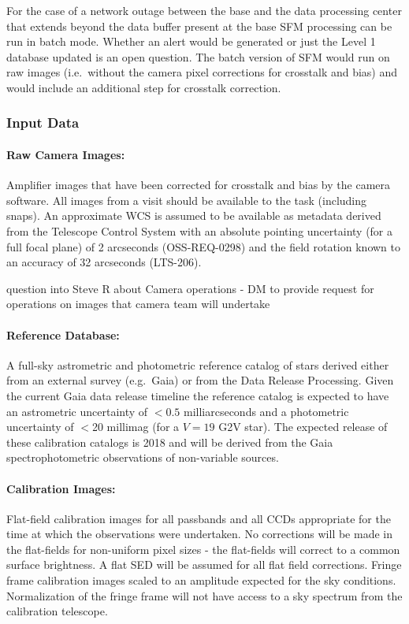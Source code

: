 For the case of a network outage between the base and the data processing center that extends beyond the data buffer present at the base SFM processing can be run in batch mode. Whether an alert would be generated or just the Level 1 database updated is an open question. The batch version of SFM would run on 
raw images (i.e.\ without the camera pixel corrections for crosstalk and bias) and would include an additional step for crosstalk correction.

\subsubsection{Input Data}
\paragraph*{Raw Camera Images:} Amplifier images that have been corrected for crosstalk and bias by the camera software. All images from a visit should be available to the task (including snaps). An approximate WCS is assumed to be available as metadata derived from the Telescope Control System with an absolute pointing uncertainty (for a full focal plane) of 2 arcseconds (OSS-REQ-0298) and the field rotation known to an accuracy of 32 arcseconds (LTS-206).
\begin{note}
question into Steve R about Camera operations - DM to provide request for operations on images that camera team will undertake
\end{note}


\paragraph*{Reference Database:} A full-sky astrometric and photometric reference catalog of stars derived either from an external survey (e.g.\ Gaia) or from the Data Release Processing. Given the current Gaia data release timeline the reference catalog is expected to have an astrometric uncertainty of $<0.5$ milliarcseconds and a photometric uncertainty of $<$20 millimag (for a $V=19$ G2V star). The expected release of these calibration catalogs is 2018 and will be derived from the Gaia spectrophotometric observations of non-variable sources.

\paragraph*{Calibration Images:} Flat-field calibration images for all passbands and all CCDs appropriate for the time at which the observations were undertaken. No corrections will be made in the flat-fields for non-uniform pixel sizes - the flat-fields will correct to a common  surface brightness. A flat SED will be assumed for all flat field corrections. Fringe frame calibration images scaled to an amplitude expected for the sky conditions. Normalization of the fringe frame will not have access to a sky spectrum from the calibration telescope.

